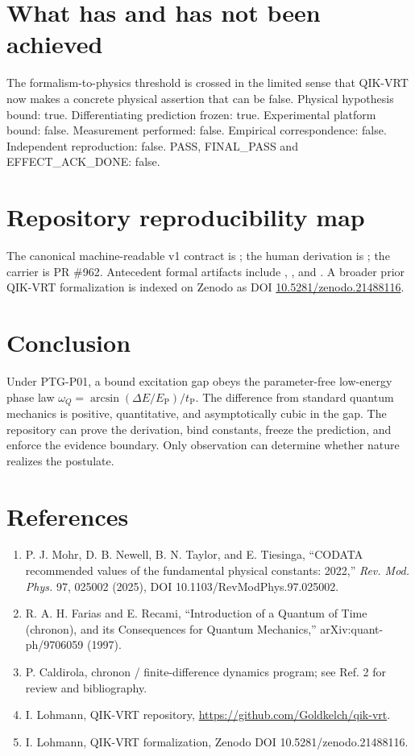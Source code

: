 \documentclass[11pt,a4paper]{article}
\newcommand{\tP}{t_{\mathrm P}}\newcommand{\EP}{E_{\mathrm P}}\newcommand{\dE}{\Delta E}\newcommand{\dw}{\Delta\omega}\newcommand{\repo}{\texttt{Goldkelch/qik-vrt}}
\begin{document}
\section{What has and has not been achieved}The formalism-to-physics threshold is crossed in the limited sense that QIK-VRT now makes a concrete physical assertion that can be false. Physical hypothesis bound: true. Differentiating prediction frozen: true. Experimental platform bound: false. Measurement performed: false. Empirical correspondence: false. Independent reproduction: false. PASS, FINAL\_PASS and EFFECT\_ACK\_DONE: false.
\section{Repository reproducibility map}The canonical machine-readable v1 contract is ; the human derivation is ; the carrier is PR \#962. Antecedent formal artifacts include , , and . A broader prior QIK-VRT formalization is indexed on Zenodo as DOI \href{https://doi.org/10.5281/zenodo.21488116}{10.5281/zenodo.21488116}.
\section{Conclusion}Under PTG-P01, a bound excitation gap obeys the parameter-free low-energy phase law $\omega_Q=\arcsin(\dE/\EP)/\tP$. The difference from standard quantum mechanics is positive, quantitative, and asymptotically cubic in the gap. The repository can prove the derivation, bind constants, freeze the prediction, and enforce the evidence boundary. Only observation can determine whether nature realizes the postulate.
\section*{References}\begin{enumerate}\item P. J. Mohr, D. B. Newell, B. N. Taylor, and E. Tiesinga, ``CODATA recommended values of the fundamental physical constants: 2022,'' \emph{Rev. Mod. Phys.} 97, 025002 (2025), DOI 10.1103/RevModPhys.97.025002.\item R. A. H. Farias and E. Recami, ``Introduction of a Quantum of Time (chronon), and its Consequences for Quantum Mechanics,'' arXiv:quant-ph/9706059 (1997).\item P. Caldirola, chronon / finite-difference dynamics program; see Ref. 2 for review and bibliography.\item I. Lohmann, QIK-VRT repository, \url{https://github.com/Goldkelch/qik-vrt}.\item I. Lohmann, QIK-VRT formalization, Zenodo DOI 10.5281/zenodo.21488116.\end{enumerate}
\end{document}
